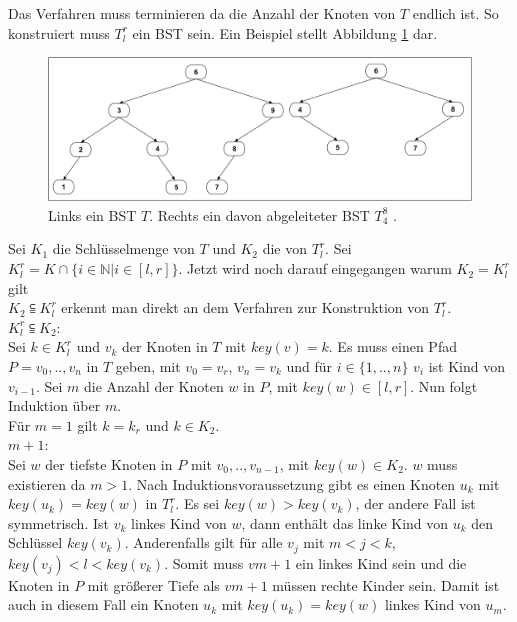 \documentclass[a4paper,12pt]{article}
\begin{document}
Das Verfahren muss terminieren da die Anzahl der Knoten von $T$ endlich ist. So konstruiert muss $T^r_l$ ein BST sein. Ein Beispiel stellt Abbildung \ref{fig:T_r_l} dar. 
\begin{figure}[h]
	\centering
	\includegraphics[width= 1\textwidth]{"Medien/DynOpt/T_r_l"}
	\caption{Links ein BST $T$. Rechts ein davon abgeleiteter BST $T^8_4$ .  }
	\label{fig:T_r_l}
\end{figure}

 \noindent Sei $K_1$ die Schlüsselmenge von $T$ und $K_2$ die von $T^r_l$. Sei ${K^r_l = K \cap \{i \in \mathbb{N}\vert i \in \left[l,r\right] \}}$. Jetzt wird noch darauf eingegangen warum $K_2 = K^r_l$ gilt \\

 \noindent $K_2 \subseteqq  K^r_l$ erkennt man direkt an dem Verfahren zur Konstruktion von $T^r_l$.\\
 
 \noindent $ K^r_l \subseteqq K_2$:\\
 Sei $k \in K^r_l$ und $v_k$ der Knoten in $T$ mit $\mathit{key}(v) = k$. Es muss einen Pfad $P = v_0,..,v_n$ in $T$ geben, mit $v_0 = v_r$, $v_n = v_k$ und für $i \in \{1,..,n\}$ $v_i$ ist Kind von $v_{i-1}$. Sei $m$ die Anzahl der Knoten $w$ in $P$, mit $\mathit{key}(w) \in \left[l,r\right]$. Nun folgt Induktion über $m$.\\
  Für $m = 1$ gilt $k = k_r$  und $k \in K_2$. \\
  $m +1$:\\
  Sei $w$ der tiefste Knoten in $P$ mit $ v_0,..,v_{n-1}$, mit $\mathit{key}(w) \in  K_2$. $w$ muss existieren da $m > 1$. Nach Induktionsvoraussetzung gibt es einen Knoten $u_k$ mit $\mathit{key}(u_k) = \mathit{key}(w)$ in $T^r_l$. Es sei $\mathit{key}(w) > \mathit{key}(v_k)$, der andere Fall ist symmetrisch. Ist $v_k$ linkes Kind von $w$, dann enthält das linke Kind von $u_k$ den Schlüssel $\mathit{key}(v_k)$. Anderenfalls gilt für alle $v_j$ mit $m < j < k$, $\mathit{key}(v_j) < l < \mathit{key}(v_k)$. Somit muss $v{m+1}$ ein linkes Kind sein und die Knoten in $P$ mit größerer Tiefe als $v{m+1}$ müssen rechte Kinder sein. Damit ist auch in diesem Fall ein Knoten $u_k$ mit $\mathit{key}(u_k) = \mathit{key}(w)$ linkes Kind von $u_m$.  \\
  
\end{document}
